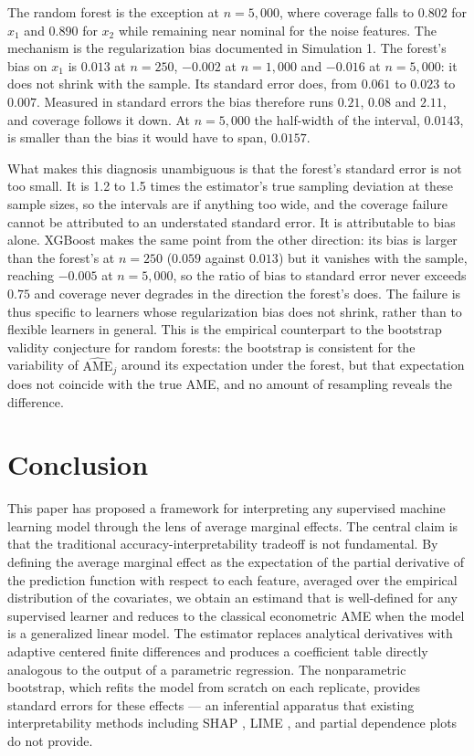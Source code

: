 \documentclass[conference]{IEEEtran}
\begin{document}
The random forest is the exception at $n=5{,}000$, where coverage falls to 0.802 for $x_1$ and 0.890 for $x_2$ while remaining near nominal for the noise features. The mechanism is the regularization bias documented in Simulation 1. The forest's bias on $x_1$ is $0.013$ at $n=250$, $-0.002$ at $n=1{,}000$ and $-0.016$ at $n=5{,}000$: it does not shrink with the sample. Its standard error does, from $0.061$ to $0.023$ to $0.007$. Measured in standard errors the bias therefore runs $0.21$, $0.08$ and $2.11$, and coverage follows it down. At $n=5{,}000$ the half-width of the interval, $0.0143$, is smaller than the bias it would have to span, $0.0157$.

What makes this diagnosis unambiguous is that the forest's standard error is not too small. It is 1.2 to 1.5 times the estimator's true sampling deviation at these sample sizes, so the intervals are if anything too wide, and the coverage failure cannot be attributed to an understated standard error. It is attributable to bias alone. XGBoost makes the same point from the other direction: its bias is larger than the forest's at $n=250$ ($0.059$ against $0.013$) but it vanishes with the sample, reaching $-0.005$ at $n=5{,}000$, so the ratio of bias to standard error never exceeds $0.75$ and coverage never degrades in the direction the forest's does. The failure is thus specific to learners whose regularization bias does not shrink, rather than to flexible learners in general. This is the empirical counterpart to the bootstrap validity conjecture for random forests: the bootstrap is consistent for the variability of $\widehat{\mathrm{AME}}_j$ around its expectation under the forest, but that expectation does not coincide with the true AME, and no amount of resampling reveals the difference.
	
	\section{Conclusion}
	
	This paper has proposed a framework for interpreting any supervised machine learning model through the lens of average marginal effects. The central claim is that the traditional accuracy-interpretability tradeoff is not fundamental. By defining the average marginal effect as the expectation of the partial derivative of the prediction function with respect to each feature, averaged over the empirical distribution of the covariates, we obtain an estimand that is well-defined for any supervised learner and reduces to the classical econometric AME when the model is a generalized linear model. The estimator replaces analytical derivatives with adaptive centered finite differences and produces a coefficient table directly analogous to the output of a parametric regression. The nonparametric bootstrap, which refits the model from scratch on each replicate, provides standard errors for these effects --- an inferential apparatus that existing interpretability methods including SHAP \cite{lundberg2017shap}, LIME \cite{ribeiro2016lime}, and partial dependence plots \cite{friedman2001pdp} do not provide.
	
\end{document}
